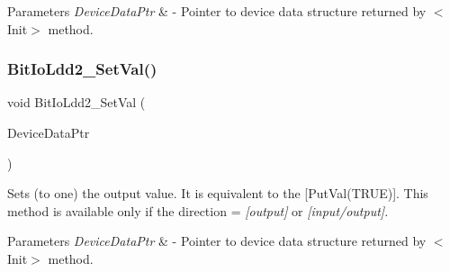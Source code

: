 \begin{DoxyParams}{Parameters}
{\em Device\+Data\+Ptr} & -\/ Pointer to device data structure returned by $<$\+Init$>$ method. \\
\hline
\end{DoxyParams}
\mbox{\label{group___bit_io_ldd2__module_gaa2b2b2e4849f05c5454ca6eb6d88fe6d}} 
\subsubsection{\texorpdfstring{Bit\+Io\+Ldd2\+\_\+\+Set\+Val()}{BitIoLdd2\_SetVal()}}
{\footnotesize\ttfamily void Bit\+Io\+Ldd2\+\_\+\+Set\+Val (\begin{DoxyParamCaption}\item[{\hyperlink{group___p_e___types__module_gac5cf1362f1f0e3a2ce71b1bf2276d091}{L\+D\+D\+\_\+\+T\+Device\+Data} $\ast$}]{Device\+Data\+Ptr }\end{DoxyParamCaption})}



Sets (to one) the output value. It is equivalent to the \mbox{[}Put\+Val(\+T\+R\+U\+E)\mbox{]}. This method is available only if the direction = {\itshape \mbox{[}output\mbox{]}} or {\itshape \mbox{[}input/output\mbox{]}}. 


\begin{DoxyParams}{Parameters}
{\em Device\+Data\+Ptr} & -\/ Pointer to device data structure returned by $<$\+Init$>$ method. \\
\hline
\end{DoxyParams}
